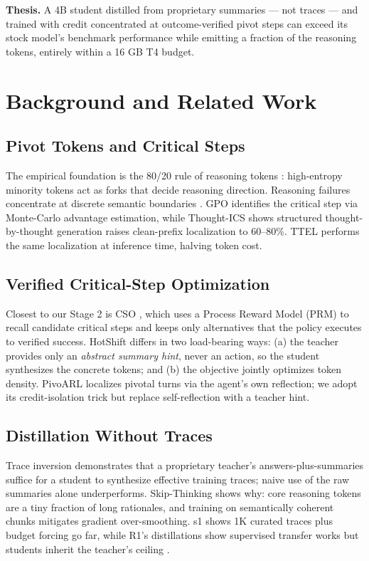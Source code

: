 \documentclass[conference]{IEEEtran}
\begin{document}
\textbf{Thesis.} A 4B student distilled from proprietary summaries --- not traces --- and trained with credit concentrated at outcome-verified pivot steps can exceed its stock model's benchmark performance while emitting a fraction of the reasoning tokens, entirely within a 16 GB T4 budget.

\section{Background and Related Work}
\label{sec:related_work}

\subsection{Pivot Tokens and Critical Steps}
The empirical foundation is the 80/20 rule of reasoning tokens \cite{wang2025}: high-entropy minority tokens act as forks that decide reasoning direction. Reasoning failures concentrate at discrete semantic boundaries \cite{liao2025}. GPO \cite{gpo} identifies the critical step via Monte-Carlo advantage estimation, while Thought-ICS \cite{thoughtics} shows structured thought-by-thought generation raises clean-prefix localization to 60--80\%. TTEL \cite{ttel} performs the same localization at inference time, halving token cost.

\subsection{Verified Critical-Step Optimization}
Closest to our Stage 2 is CSO \cite{cso}, which uses a Process Reward Model (PRM) to recall candidate critical steps and keeps only alternatives that the policy executes to verified success. HotShift differs in two load-bearing ways: (a) the teacher provides only an \textit{abstract summary hint}, never an action, so the student synthesizes the concrete tokens; and (b) the objective jointly optimizes token density. PivoARL \cite{pivoarl} localizes pivotal turns via the agent's own reflection; we adopt its credit-isolation trick but replace self-reflection with a teacher hint.

\subsection{Distillation Without Traces}
Trace inversion \cite{zhang2026} demonstrates that a proprietary teacher's answers-plus-summaries suffice for a student to synthesize effective training traces; naive use of the raw summaries alone underperforms. Skip-Thinking \cite{skipthinking} shows why: core reasoning tokens are a tiny fraction of long rationales, and training on semantically coherent chunks mitigates gradient over-smoothing. s1 \cite{s1} shows 1K curated traces plus budget forcing go far, while R1's distillations show supervised transfer works but students inherit the teacher's ceiling \cite{r1}.
\end{document}
